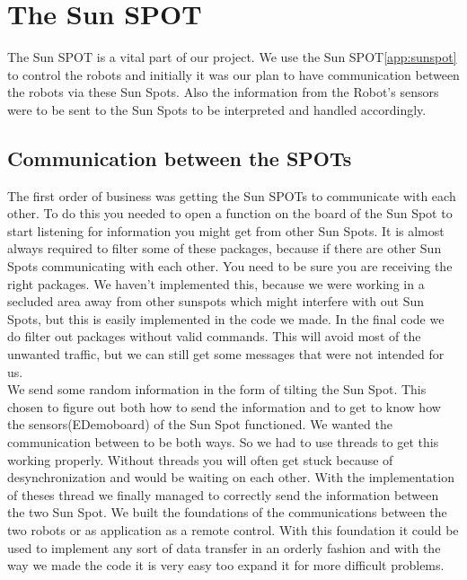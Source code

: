 \documentclass[a4,english]{article}
\begin{document}
\section{The Sun SPOT}
\label{sec:sunspot}
The Sun SPOT is a vital part of our project. We use the Sun SPOT\ref{app:sunspot} to control the robots and initially it was our plan to have communication between the robots via these Sun Spots. Also the information from the Robot's sensors were to be sent to the Sun Spots to be interpreted and handled accordingly.
\subsection{Communication between the SPOTs}
\label{subsec:comm}
The first order of business was getting the Sun SPOTs to communicate with each other. To do this you needed to open a function on the board of the Sun Spot to start listening for information you might get from other Sun Spots. It is almost always required to filter some of these packages, because if there are other Sun Spots communicating with each other. You need to be sure you are receiving the right packages. We haven't implemented this, because we were working in a secluded area away from other sunspots which might interfere with out Sun Spots, but this is easily implemented in the code we made. In the final code we do filter out packages without valid commands. This will avoid most of the unwanted traffic, but we can still get some messages that were not intended for us. \\
We send some random information in the form of tilting the Sun Spot. This chosen to figure out both how to send the information and to get to know how the sensors(EDemoboard) of the Sun Spot functioned. We wanted the communication between to be both ways. So we had to use threads to get this working properly. Without threads you will often get stuck because of desynchronization and would be waiting on each other.
With the implementation of theses thread we finally managed to correctly send the information between the two Sun Spot. 
We built the foundations of the communications between the two robots or as application as a remote control. With this foundation it could be used to implement any sort of data transfer in an orderly fashion and with the way we made the code it is very easy too expand it for more difficult problems. 
\end{document}
